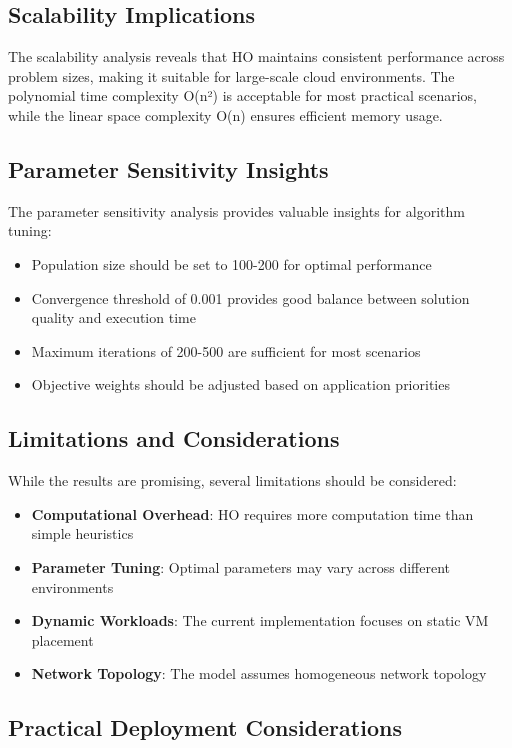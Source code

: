 \documentclass[conference]{IEEEtran}
\begin{document}
\subsection{Scalability Implications}

The scalability analysis reveals that HO maintains consistent performance across problem sizes, making it suitable for large-scale cloud environments. The polynomial time complexity O(n²) is acceptable for most practical scenarios, while the linear space complexity O(n) ensures efficient memory usage.

\subsection{Parameter Sensitivity Insights}

The parameter sensitivity analysis provides valuable insights for algorithm tuning:
\begin{itemize}
    \item Population size should be set to 100-200 for optimal performance
    \item Convergence threshold of 0.001 provides good balance between solution quality and execution time
    \item Maximum iterations of 200-500 are sufficient for most scenarios
    \item Objective weights should be adjusted based on application priorities
\end{itemize}

\subsection{Limitations and Considerations}

While the results are promising, several limitations should be considered:
\begin{itemize}
    \item \textbf{Computational Overhead}: HO requires more computation time than simple heuristics
    \item \textbf{Parameter Tuning}: Optimal parameters may vary across different environments
    \item \textbf{Dynamic Workloads}: The current implementation focuses on static VM placement
    \item \textbf{Network Topology}: The model assumes homogeneous network topology
\end{itemize}

\subsection{Practical Deployment Considerations}
\end{document}
